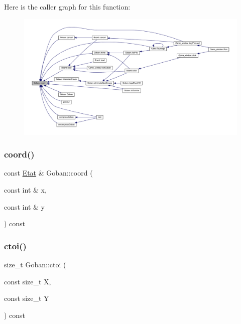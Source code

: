 Here is the caller graph for this function\+:\nopagebreak
\begin{figure}[H]
\begin{center}
\leavevmode
\includegraphics[width=350pt]{class_goban_a29aaf8df380fe614845d48cba057747c_icgraph}
\end{center}
\end{figure}
\mbox{\label{class_goban_ac674775d4101d921257acc21cfec935c}} 
\subsubsection{\texorpdfstring{coord()}{coord()}\hspace{0.1cm}{\footnotesize\ttfamily [2/2]}}
{\footnotesize\ttfamily const \hyperlink{class_etat}{Etat} \& Goban\+::coord (\begin{DoxyParamCaption}\item[{const int \&}]{x,  }\item[{const int \&}]{y }\end{DoxyParamCaption}) const}

\mbox{\label{class_goban_a579840586df08a58983f6b497979344b}} 
\subsubsection{\texorpdfstring{ctoi()}{ctoi()}}
{\footnotesize\ttfamily size\+\_\+t Goban\+::ctoi (\begin{DoxyParamCaption}\item[{const size\+\_\+t}]{X,  }\item[{const size\+\_\+t}]{Y }\end{DoxyParamCaption}) const}

